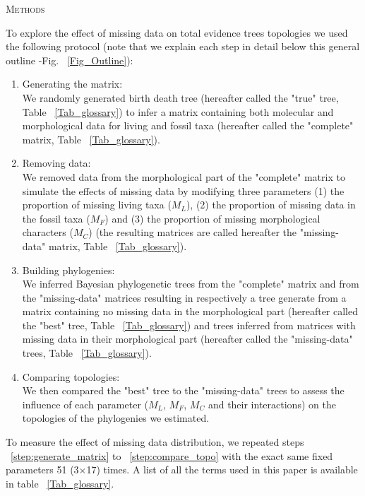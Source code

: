 \documentclass[12pt,letterpaper]{article}
\renewcommand{\section}[1]{%
\bigskip
\begin{center}
\begin{Large}
\normalfont\scshape #1
\medskip
\end{Large}
\end{center}}
\begin{document}


%
%


\section{Methods} %
To explore the effect of missing data on total evidence trees topologies we used the following protocol (note that we explain each step in detail below this general outline -Fig. ~\ref{Fig_Outline}):
\begin{enumerate}
\item{Generating the matrix:} \\
\label{step:generate_matrix}
We randomly generated birth death tree (hereafter called the "true" tree, Table ~\ref{Tab_glossary}) to infer a matrix containing both molecular and morphological data for living and fossil taxa (hereafter called the "complete" matrix, Table ~\ref{Tab_glossary}).
\item{Removing data:} \\
\label{step:remove_data}
We removed data from the morphological part of the "complete" matrix to simulate the effects of missing data by modifying three parameters (1) the proportion of missing living taxa ($M_{L}$), (2) the proportion of missing data in the fossil taxa ($M_{F}$) and (3) the proportion of missing morphological characters ($M_{C}$) (the resulting matrices are called hereafter the "missing-data" matrix, Table ~\ref{Tab_glossary}).
\item{Building phylogenies:} \\
\label{step:build_phylo}
We inferred Bayesian phylogenetic trees from the "complete" matrix and from the "missing-data" matrices resulting in respectively a tree generate from a matrix containing no missing data in the morphological part (hereafter called the "best" tree, Table ~\ref{Tab_glossary}) and trees inferred from matrices with missing data in their morphological part (hereafter called the "missing-data" trees, Table ~\ref{Tab_glossary}).
\item{Comparing topologies:} \\
\label{step:compare_topo}
We then compared the "best" tree to the "missing-data" trees to assess the influence of each parameter ($M_{L}$, $M_{F}$, $M_{C}$ and their interactions) on the topologies of the phylogenies we estimated.
\end{enumerate}
To measure the effect of missing data distribution, we repeated steps ~\ref{step:generate_matrix} to ~\ref{step:compare_topo} with the exact same fixed parameters 51 (3$\times$17) times. %
A list of all the terms used in this paper is available in table ~\ref{Tab_glossary}.
\end{document}
